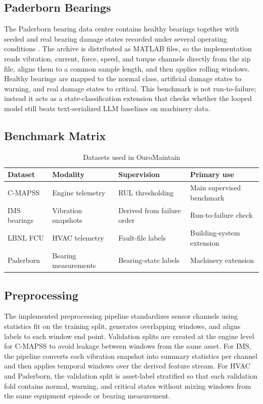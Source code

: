 \subsection{Paderborn Bearings}
The Paderborn bearing data center contains healthy bearings together with seeded and real bearing damage states recorded under several operating conditions \cite{PaderbornBearingDataset}. The archive is distributed as MATLAB files, so the implementation reads vibration, current, force, speed, and torque channels directly from the zip file, aligns them to a common sample length, and then applies rolling windows. Healthy bearings are mapped to the normal class, artificial damage states to warning, and real damage states to critical. This benchmark is not run-to-failure; instead it acts as a state-classification extension that checks whether the looped model still beats text-serialized LLM baselines on machinery data.

\subsection{Benchmark Matrix}
\begin{table}[t]
\centering
\caption{Datasets used in OuroMaintain}
\label{tab:datasets}
\begin{tabular}{@{}p{1.8cm}p{1.8cm}p{1.7cm}p{2.4cm}@{}}
\toprule
Dataset & Modality & Supervision & Primary use \\
\midrule
C-MAPSS & Engine telemetry & RUL thresholding & Main supervised benchmark \\
IMS bearings & Vibration snapshots & Derived from failure order & Run-to-failure check \\
LBNL FCU & HVAC telemetry & Fault-file labels & Building-system extension \\
Paderborn & Bearing measurements & Bearing-state labels & Machinery extension \\
\bottomrule
\end{tabular}
\end{table}

\subsection{Preprocessing}
The implemented preprocessing pipeline standardizes sensor channels using statistics fit on the training split, generates overlapping windows, and aligns labels to each window end point. Validation splits are created at the engine level for C-MAPSS to avoid leakage between windows from the same asset. For IMS, the pipeline converts each vibration snapshot into summary statistics per channel and then applies temporal windows over the derived feature stream. For HVAC and Paderborn, the validation split is asset-label stratified so that each validation fold contains normal, warning, and critical states without mixing windows from the same equipment episode or bearing measurement.

